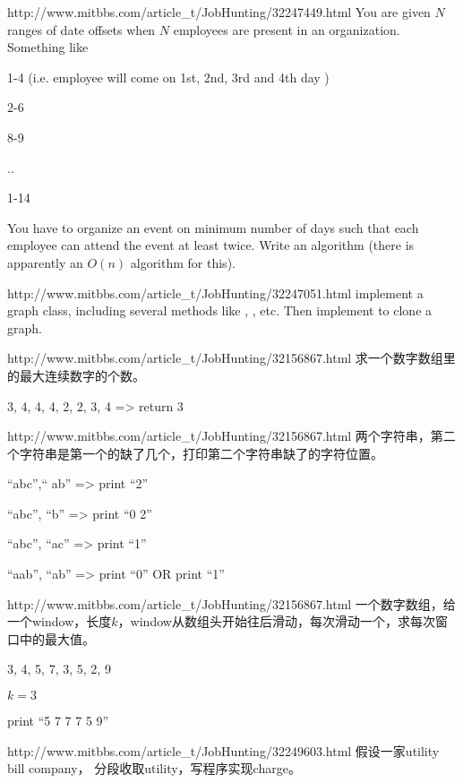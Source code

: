 \documentclass[a4paper]{article}
\newcommand{\ilcode}[1]{
	\framebox[\width]{\texttt{#1}}
}
\begin{document}
\begin{CJK}{UTF8}{gbsn}
\begin{enumerate}
\begin{Q}[Facebook]{http://www.mitbbs.com/article_t/JobHunting/32247449.html}
You are given $N$ ranges of date offsets when $N$ employees are present in an organization. Something like

1-4 (i.e. employee will come on 1st, 2nd, 3rd and 4th day )

2-6

8-9

..

1-14

You have to organize an event on minimum number of days such that each employee can attend the event at least twice. Write an algorithm (there is apparently an $O(n)$ algorithm for this).
\end{Q}

\begin{Q}[Amazon]{http://www.mitbbs.com/article_t/JobHunting/32247051.html}
implement a graph class, including several methods like \ilcode{addNode()}, \ilcode{addEdge()}, etc. Then implement to clone a graph.
\end{Q}

\begin{Q}[Google]{http://www.mitbbs.com/article_t/JobHunting/32156867.html}
求一个数字数组里的最大连续数字的个数。

3, 4, 4, 4, 2, 2, 3, 4  =>  return 3
\end{Q}

\begin{Q}[Google]{http://www.mitbbs.com/article_t/JobHunting/32156867.html}
两个字符串，第二个字符串是第一个的缺了几个，打印第二个字符串缺了的字符位置。

``abc'',`` ab'' => print  ``2''

``abc'', ``b'' => print ``0 2''

``abc'', ``ac'' => print ``1''

``aab'', ``ab'' =>  print ``0''   OR   print ``1''
\end{Q}

\begin{Q}[Google]{http://www.mitbbs.com/article_t/JobHunting/32156867.html}
一个数字数组，给一个window，长度$k$，window从数组头开始往后滑动，每次滑动一个，求每次窗口中的最大值。

3, 4, 5, 7, 3, 5, 2, 9 

$k = 3$

print  ``5 7 7 7 5 9''
\end{Q}

\begin{Q}[Google]{http://www.mitbbs.com/article_t/JobHunting/32249603.html}
假设一家utility bill company， 分段收取utility，写程序实现charge。
\end{Q}


\end{enumerate}
\end{CJK}
\end{document}
